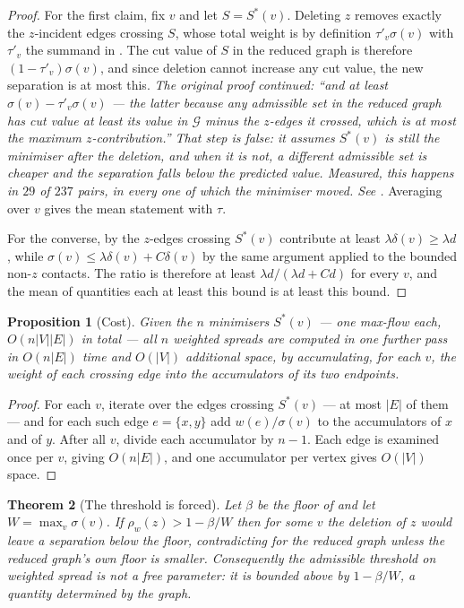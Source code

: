 \documentclass[11pt,a4paper]{article}
\newtheorem{theorem}{Theorem}[section]
\newtheorem{proposition}[theorem]{Proposition}
\theoremstyle{definition}
\theoremstyle{remark}
\newcommand{\Gph}{\mathcal{G}}
\newcommand{\wt}{w}
\newcommand{\flo}{\beta}
\newcommand{\sep}{\sigma}
\newcommand{\dep}{\delta}
\newcommand{\spr}{\rho}                       %
\begin{document}
\begin{proof}
For the first claim, fix $v$ and let $S = S^{\ast}(v)$. Deleting $z$
removes exactly the $z$-incident edges crossing $S$, whose total weight
is by definition $\tau'_v \sep(v)$ with $\tau'_v$ the summand in
. The cut value of $S$ in the reduced graph is
therefore $(1-\tau'_v)\sep(v)$, and since deletion cannot increase any
cut value, the new separation is at most this. \emph{The original proof
continued: ``and at least $\sep(v) - \tau'_v\sep(v)$ --- the latter
because any admissible set in the reduced graph has cut value at least
its value in $\Gph$ minus the $z$-edges it crossed, which is at most the
maximum $z$-contribution.'' That step is false: it assumes
$S^{\ast}(v)$ is still the minimiser after the deletion, and when it is
not, a different admissible set is cheaper and the separation falls
below the predicted value. Measured, this happens in $29$ of $237$
pairs, in every one of which the minimiser moved. See
.}
Averaging over $v$ gives the mean statement with $\tau$.

For the converse, by  the $z$-edges crossing
$S^{\ast}(v)$ contribute at least $\lambda\dep(v) \geq \lambda d$, while
$\sep(v) \leq \lambda\dep(v) + C\dep(v)$ by the same argument applied to
the bounded non-$z$ contacts. The ratio is therefore at least
$\lambda d/(\lambda d + Cd)$ for every $v$, and the mean of quantities
each at least this bound is at least this bound.
\end{proof}

\begin{proposition}[Cost]\label{prop:spread-cost}
Given the $n$ minimisers $S^{\ast}(v)$ --- one max-flow each, $O(n|V||E|)$
in total --- all $n$ weighted spreads are computed in one further pass in
$O(n|E|)$ time and $O(|V|)$ additional space, by accumulating, for each
$v$, the weight of each crossing edge into the accumulators of its two
endpoints.
\end{proposition}

\begin{proof}
For each $v$, iterate over the edges crossing $S^{\ast}(v)$ --- at most
$|E|$ of them --- and for each such edge $e = \{x,y\}$ add
$\wt(e)/\sep(v)$ to the accumulators of $x$ and of $y$. After all $v$,
divide each accumulator by $n-1$. Each edge is examined once per $v$,
giving $O(n|E|)$, and one accumulator per vertex gives $O(|V|)$ space.
\end{proof}

\begin{theorem}[The threshold is forced]\label{thm:threshold}
Let $\flo$ be the floor of  and let $W = \max_{v}\sep(v)$.
If $\spr_{\wt}(z) > 1 - \flo/W$ then for some $v$ the deletion of $z$
would leave a separation below the floor, contradicting
 for the reduced graph unless the reduced graph's own
floor is smaller. Consequently the admissible threshold on weighted
spread is not a free parameter: it is bounded above by $1 - \flo/W$,
a quantity determined by the graph.
\end{theorem}
\end{document}
